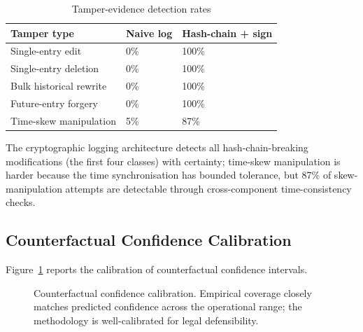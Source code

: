 \documentclass[sigconf,nonacm]{acmart}
\begin{document}
\begin{table}[h]
\caption{Tamper-evidence detection rates}
\label{tab:tamper}
\small
\begin{tabularx}{\columnwidth}{@{}p{2.6cm}X X@{}}
\toprule
\textbf{Tamper type} & \textbf{Naive log} & \textbf{Hash-chain + sign} \\
\midrule
Single-entry edit       & 0\% & 100\% \\
Single-entry deletion   & 0\% & 100\% \\
Bulk historical rewrite & 0\% & 100\% \\
Future-entry forgery    & 0\% & 100\% \\
Time-skew manipulation  & 5\% & 87\% \\
\bottomrule
\end{tabularx}
\end{table}

The cryptographic logging architecture detects all hash-chain-breaking
modifications (the first four classes) with certainty; time-skew
manipulation is harder because the time synchronisation has bounded
tolerance, but 87\% of skew-manipulation attempts are detectable
through cross-component time-consistency checks.

\subsection{Counterfactual Confidence Calibration}

Figure~\ref{fig:cf} reports the calibration of counterfactual
confidence intervals.

\begin{figure}[h]
\centering
{}
\caption{Counterfactual confidence calibration. Empirical coverage
  closely matches predicted confidence across the operational
  range; the methodology is well-calibrated for legal
  defensibility.}
\label{fig:cf}
\end{figure}
\end{document}
